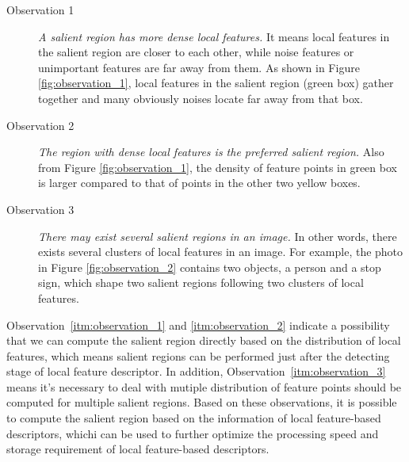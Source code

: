 \begin{description}
	
\item[Observation 1]  \textit{A salient region has more dense local features.} It means local features in the salient region are closer to each other, while noise features or unimportant features are far away from them. As shown in Figure \ref{fig:observation_1}, local features in the salient region (green box) gather together and many obviously noises locate far away from that box. 

\item[Observation 2]  \textit{The region with dense  local features is the preferred salient region.} Also from Figure \ref{fig:observation_1}, the density of feature points in green box is larger compared to that of points in the other two yellow boxes. 

\item[Observation 3]  \textit{There may exist several salient regions in an image.} In other words, there exists several clusters of local features in an image. For example, the photo in Figure \ref{fig:observation_2} contains two objects, a person and a stop sign, which shape two salient regions following two clusters of local features.

\end{description}

Observation~\ref{itm:observation_1} and \ref{itm:observation_2} indicate a possibility that we can compute the salient region directly based on the distribution of local features, which means salient regions can be performed just after the detecting stage of local feature descriptor. In addition, Observation~\ref{itm:observation_3} means it's necessary to deal with mutiple distribution of feature points should be computed for multiple salient regions. Based on these observations, it is possible to compute the salient region based on the information of local feature-based descriptors, whichi can be used to further optimize the processing speed and storage requirement of local feature-based descriptors.